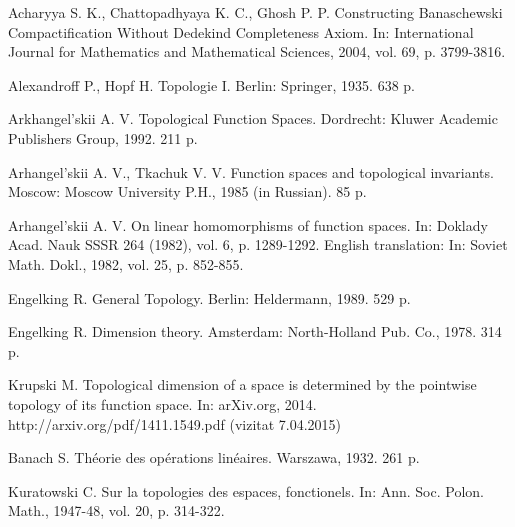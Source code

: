\documentclass[a4paper, 12pt]{report}
\begin{document}
\renewcommand{\bibname}{A. Referințe bibliografice în limba engleză}
\begin{thebibliography}{99}

 Acharyya S. K., Chattopadhyaya K. C., Ghosh P. P. Constructing Banaschewski Compactification Without Dedekind Completeness Axiom. In: International Journal for Mathematics and Mathematical Sciences, 2004, vol. 69, p. 3799-3816.

 Alexandroff P., Hopf H. Topologie I. Berlin: Springer, 1935. 638 p.

 Arkhangel'skii A. V. Topological Function Spaces. Dordrecht: Kluwer Academic Publishers Group, 1992. 211 p.

 Arhangel'skii A. V., Tkachuk V. V. Function spaces and topological invariants. Moscow: Moscow University P.H., 1985 (in Russian). 85 p.

 Arhangel'skii A. V. On linear homomorphisms of  function spaces. In: Doklady  Acad. Nauk SSSR 264 (1982), vol. 6, p. 1289-1292. English translation: In: Soviet Math. Dokl., 1982, vol. 25, p. 852-855.

 Engelking R. General Topology. Berlin: Heldermann, 1989. 529 p.

 Engelking R. Dimension theory. Amsterdam: North-Holland Pub. Co., 1978. 314 p.

 Krupski M. Topological dimension of a space is determined by the pointwise topology of its function space. In: arXiv.org, 2014. http://arxiv.org/pdf/1411.1549.pdf (vizitat 7.04.2015)

\setcounter{firstbib}{\value{enumiv}}

\end{thebibliography}

\renewcommand{\bibname}{B. Referințe bibliografice în limba franceză}
\begin{thebibliography}{9}

\setcounter{enumiv}{\value{firstbib}}

 Banach S. Théorie des opérations linéaires. Warszawa, 1932. 261 p.

 Kuratowski C. Sur la topologies des espaces, fonctionels. In: Ann. Soc. Polon. Math., 1947-48, vol. 20, p. 314-322.

\end{thebibliography}

\newpage
\end{document}
